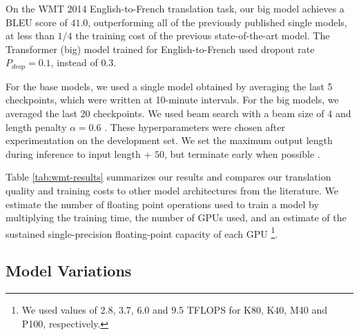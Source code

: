 \documentclass{article}
\begin{document}
On the WMT 2014 English-to-French translation task, our big model achieves a BLEU score of $41.0$, outperforming all of the previously published single models, at less than $1/4$ the training cost of the previous state-of-the-art model. The Transformer (big) model trained for English-to-French used dropout rate $P_{drop}=0.1$, instead of $0.3$.

For the base models, we used a single model obtained by averaging the last 5 checkpoints, which were written at 10-minute intervals.  For the big models, we averaged the last 20 checkpoints. We used beam search with a beam size of $4$ and length penalty $\alpha=0.6$ \citep{wu2016google}.  These hyperparameters were chosen after experimentation on the development set.  We set the maximum output length during inference to input length + $50$, but terminate early when possible \citep{wu2016google}.

Table \ref{tab:wmt-results} summarizes our results and compares our translation quality and training costs to other model architectures from the literature.  We estimate the number of floating point operations used to train a model by multiplying the training time, the number of GPUs used, and an estimate of the sustained single-precision floating-point capacity of each GPU \footnote{We used values of 2.8, 3.7, 6.0 and 9.5 TFLOPS for K80, K40, M40 and P100, respectively.}.

\subsection{Model Variations}
\end{document}
